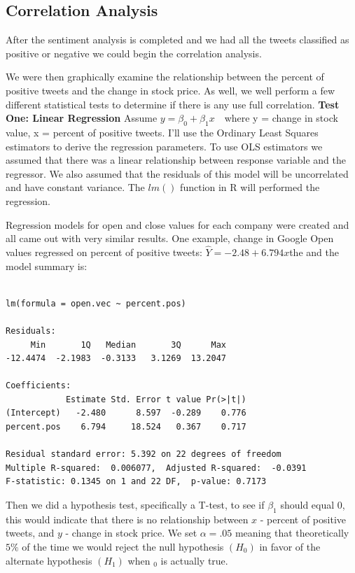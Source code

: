 \documentclass{acm_proc_article-sp}
\begin{document}
\subsection{Correlation Analysis}

After the sentiment analysis is completed and we had all the tweets
classified as positive or negative we could begin the correlation analysis.

We were then graphically examine the relationship between
the percent of positive tweets and the change in stock price. As well, we well
perform a few different statistical tests to determine if there is any use full
correlation. \newline\textbf{  Test One: Linear Regression} \newline\indent
Assume $ y = \beta_0  + \beta_1x\ \ \  $ where y = change in stock value, x =
percent of positive tweets. I'll use the Ordinary Least Squares estimators to
derive the regression parameters. To use OLS estimators we assumed that
there was a linear relationship between response variable and the regressor. We
also assumed that the residuals of this model will be uncorrelated and
have constant variance. The $lm()$ function in R will performed the regression.


Regression models for open and close values for each company were created and
all came out with very similar results.  One example, change in
Google Open values regressed on percent of positive tweets: \newline\indent
$\hat{Y} = -2.48 + 6.794 x$the \newline\indent and the model summary is:

\begin{verbatim} 

lm(formula = open.vec ~ percent.pos)

Residuals:
     Min       1Q   Median       3Q      Max 
-12.4474  -2.1983  -0.3133   3.1269  13.2047 

Coefficients:
            Estimate Std. Error t value Pr(>|t|)
(Intercept)   -2.480      8.597  -0.289    0.776
percent.pos    6.794     18.524   0.367    0.717

Residual standard error: 5.392 on 22 degrees of freedom
Multiple R-squared:  0.006077,  Adjusted R-squared:  -0.0391 
F-statistic: 0.1345 on 1 and 22 DF,  p-value: 0.7173

\end{verbatim}

\indent Then we did a hypothesis test, specifically a T-test, to see if
$\beta_1$ should equal 0, this would indicate that there is no relationship
between $x$ - percent of positive tweets, and $y$ - change in stock price. We
set $\alpha = .05$ meaning that theoretically $5 \%$ of the time we
would reject the null hypothesis $ (H_0)$ in favor of the alternate hypothesis
$(H_1)$ when $ _0$ is actually true.  
\end{document}

